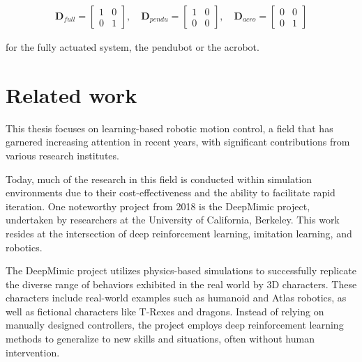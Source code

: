     \begin{equation}
        \begin{split}
            \mathbf{D}_{full} =
            \left[
                \begin{matrix}
                    1 & 0 \\
                    0 & 1
                \end{matrix}
            \right],
            \quad
            \mathbf{D}_{pendu} =
            \left[
                \begin{matrix}
                    1 & 0 \\
                    0 & 0
                \end{matrix}
            \right],
            \quad
            \mathbf{D}_{acro} =
            \left[
                \begin{matrix}
                    0 & 0 \\
                    0 & 1
                \end{matrix}
            \right]
        \end{split}
    \end{equation}
    
    for the fully actuated system, the pendubot or the acrobot.

\section{Related work}
This thesis focuses on learning-based robotic motion control, a field that has garnered increasing attention in recent years, with significant contributions from various research institutes.

Today, much of the research in this field is conducted within simulation environments due to their cost-effectiveness and the ability to facilitate rapid iteration. One noteworthy project from 2018 is the DeepMimic project\cite{peng2018deepmimic}, undertaken by researchers at the University of California, Berkeley. This work resides at the intersection of deep reinforcement learning, imitation learning, and robotics.

The DeepMimic project utilizes physics-based simulations to successfully replicate the diverse range of behaviors exhibited in the real world by 3D characters. These characters include real-world examples such as humanoid and Atlas robotics, as well as fictional characters like T-Rexes and dragons. Instead of relying on manually designed controllers, the project employs deep reinforcement learning methods to generalize to new skills and situations, often without human intervention.

